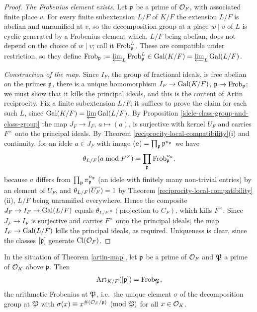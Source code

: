 \begin{proof}
\emph{The Frobenius element exists.}
Let ${\mathfrak{p}}$ be a prime of ${\mathcal {O}}_F$, with associated finite place $v$.
For every finite subextension $L/F$ of $K/F$ the extension $L/F$ is abelian and
unramified at $v$, so the decomposition group at a place $w\mid v$ of $L$ is
cyclic generated by a Frobenius element which, $L/F$ being abelian, does not
depend on the choice of $w\mid v$; call it ${\mathrm{Frob}}_{\mathfrak{p}}^{L}$.
These are compatible under restriction, so they define
${\mathrm{Frob}}_{\mathfrak{p}}:=\varprojlim_L{\mathrm{Frob}}_{\mathfrak{p}}^L\in{\mathrm{Gal}}(K/F)=\varprojlim_L{\mathrm{Gal}}(L/F)$.

\emph{Construction of the map.}
Since $I_F$, the group of fractional ideals, is free abelian on the primes
${\mathfrak{p}}$, there is a unique homomorphism $I_F\to{\mathrm{Gal}}(K/F)$, ${\mathfrak{p}}\mapsto{\mathrm{Frob}}_{\mathfrak{p}}$;
we must show that it kills the principal ideals, and this is the content of
Artin reciprocity.
Fix a finite subextension $L/F$; it suffices to prove the claim for each such
$L$, since ${\mathrm{Gal}}(K/F)=\varprojlim{\mathrm{Gal}}(L/F)$.
By Proposition \ref{idele-class-group-and-class-group} the map $J_F\to I_F$,
$a\mapsto(a)$, is surjective with kernel $U_F$ and carries $F^\times$ onto the
principal ideals.
By Theorem \ref{reciprocity-local-compatibility}(i) and continuity, for an idele
$a\in J_F$ with image $(a)=\prod_{\mathfrak{p}}{\mathfrak{p}}^{n_{\mathfrak{p}}}$ we have
$$\theta_{L/F}(a\bmod F^\times)=\prod_{\mathfrak{p}}{\mathrm{Frob}}_{\mathfrak{p}}^{n_{\mathfrak{p}}},$$
because $a$ differs from $\prod_{\mathfrak{p}}\pi_{\mathfrak{p}}^{n_{\mathfrak{p}}}$ (an idele with finitely many
non-trivial entries) by an element of $U_F$, and
$\theta_{L/F}(\overline{U_F})=1$ by Theorem
\ref{reciprocity-local-compatibility}(ii), $L/F$ being unramified everywhere.
Hence the composite $J_F\to I_F\to{\mathrm{Gal}}(L/F)$ equals
$\theta_{L/F}\circ(\text{projection to }C_F)$, which kills $F^\times$.
Since $J_F\to I_F$ is surjective and carries $F^\times$ onto the principal
ideals, the map $I_F\to{\mathrm{Gal}}(L/F)$ kills the principal ideals, as required.
Uniqueness is clear, since the classes $[{\mathfrak{p}}]$ generate ${\mathrm{Cl}}({\mathcal {O}}_F)$.
\end{proof}

\begin{thm}
\label{artin-map-spec}
In the situation of Theorem \ref{artin-map}, let ${\mathfrak{p}}$ be a prime of ${\mathcal {O}}_F$ and
${\mathfrak{P}}$ a prime of ${\mathcal {O}}_K$ above ${\mathfrak{p}}$. Then
$$\mathrm{Art}_{K/F}([{\mathfrak{p}}])={\mathrm{Frob}}_{\mathfrak{P}},$$
the arithmetic Frobenius at ${\mathfrak{P}}$, i.e.~the unique element $\sigma$ of the
decomposition group at ${\mathfrak{P}}$ with $\sigma(x)\equiv x^{\#({\mathcal {O}}_F/{\mathfrak{p}})}
\pmod{{\mathfrak{P}}}$ for all $x\in{\mathcal {O}}_K$.
\end{thm}

